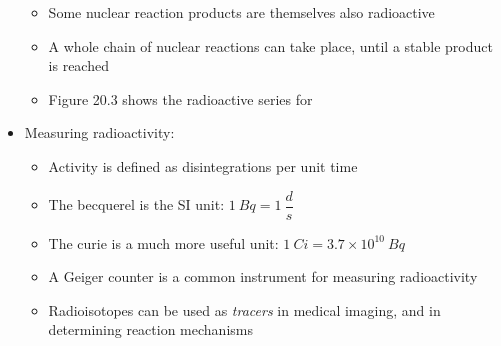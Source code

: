\documentclass[12pt, openany, letterpaper]{memoir}
\begin{document}
\begin{itemize}
\begin{itemize}
		\item Some nuclear reaction products are themselves also radioactive
		\item A whole chain of nuclear reactions can take place, until a stable product is reached
		\item Figure 20.3 shows the radioactive series for 
	\end{itemize}
	\item Measuring radioactivity:
	\begin{itemize}
		\item Activity is defined as disintegrations per unit time
		\item The becquerel is the SI unit: $1~Bq = 1~\dfrac{d}{s}$
		\item The curie is a much more useful unit: $1~Ci = 3.7\times10^{10}~Bq$
		\item A Geiger counter is a common instrument for measuring radioactivity
		\item Radioisotopes can be used as \emph{tracers} in medical imaging, and in determining reaction mechanisms
	\end{itemize}
\end{itemize}
\end{document}
